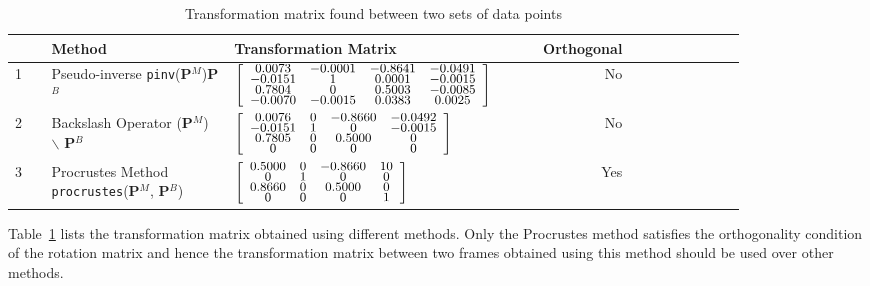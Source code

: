 \begin{table}[!b]
  \centering
  \caption{Transformation matrix found between two sets of data points}
    \begin{tabular}{p{0.05\linewidth} p{0.25\linewidth} p{0.4\linewidth} rp{0.15\linewidth}}
    \toprule
          & Method & Transformation Matrix & Orthogonal \\
    \midrule
    1     &
     Pseudo-inverse \texttt{pinv}(\textbf{P}$^M$)\textbf{P}$^B$ &  $\mbox{\fontsize{9}{6}\selectfont\(\left[\begin{array}{cccc}  0.0073 & -0.0001 & -0.8641 & -0.0491\\ -0.0151 & 1 & 0.0001 & -0.0015\\ 0.7804 & 0 & 0.5003 & -0.0085\\ -0.0070 & -0.0015 & 0.0383 & 0.0025 \end{array}\right]\)}$     
     & No \\
     
    2     &
     Backslash Operator (\textbf{P}$^M$) $\backslash$ \textbf{P}$^B$ & $\mbox{\fontsize{9}{6}\selectfont\(\left[\begin{array}{cccc} 0.0076 & 0 & -0.8660 & -0.0492\\ -0.0151 & 1 & 0 & -0.0015\\ 0.7805 & 0 & 0.5000  & 0\\ 0 & 0 & 0 & 0 \end{array}\right]\)}$  
     & No \\
    3     & 
    Procrustes Method \texttt{procrustes}(\textbf{P}$^M$, \textbf{P}$^B$) &   $\mbox{\fontsize{9}{6}\selectfont\(\left[\begin{array}{cccc} 0.5000  & 0 & -0.8660 & 10\\ 0 & 1 & 0 & 0\\ 0.8660 & 0 & 0.5000 & 0\\ 0 & 0 & 0 & 1 \end{array}\right]\)}$     
    
    & Yes \\
    \bottomrule
    \end{tabular}%
  \label{tab:comp_rot}%
\end{table}%

Table~\ref{tab:comp_rot} lists the transformation matrix obtained using different methods. Only the Procrustes method satisfies the orthogonality condition of the rotation matrix and hence the transformation matrix between two frames obtained using this method should be used over other methods.  